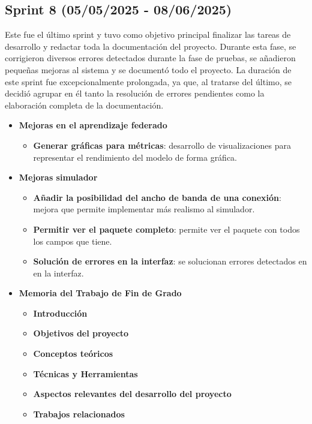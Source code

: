 \subsection{Sprint 8 (05/05/2025 - 08/06/2025)}
\label{subsec:OctavoSprint}
Este fue el último sprint y tuvo como objetivo principal finalizar las tareas de desarrollo y redactar toda la documentación del proyecto. Durante esta fase, se corrigieron diversos errores detectados durante la fase de pruebas, se añadieron pequeñas mejoras al sistema y se documentó todo el proyecto. La duración de este sprint fue excepcionalmente prolongada, ya que, al tratarse del último, se decidió agrupar en él tanto la resolución de errores pendientes como la elaboración completa de la documentación.

\begin{itemize}
    \item \textbf{Mejoras en el aprendizaje federado}
    \begin{itemize}
        \item \textbf{Generar gráficas para métricas}: desarrollo de visualizaciones para representar el rendimiento del modelo de forma gráfica.
    \end{itemize}
    \item \textbf{Mejoras simulador}
    \begin{itemize}
        \item \textbf{Añadir la posibilidad del ancho de banda de una conexión}: mejora que permite implementar más realismo al simulador.
        \item \textbf{Permitir ver el paquete completo}: permite ver el paquete con todos los campos que tiene.
        \item \textbf{Solución de errores en la interfaz}: se solucionan errores detectados en en la interfaz.
    \end{itemize}
    \item \textbf{Memoria del Trabajo de Fin de Grado}
    \begin{itemize}
        \item \textbf{Introducción}
        \item \textbf{Objetivos del proyecto}
        \item \textbf{Conceptos teóricos}
        \item \textbf{Técnicas y Herramientas}
        \item \textbf{Aspectos relevantes del desarrollo del proyecto}
        \item \textbf{Trabajos relacionados}

\end{itemize}
\end{itemize}
